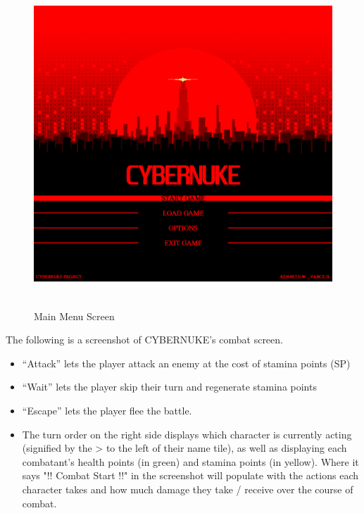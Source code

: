 \documentclass[10pt,conference,onecolumn,compsoc]{IEEEtran}
\begin{document}
\begin{figure}[ht!]
\centering
\includegraphics[height=462px, width=500px]{Mockups/CYBERNUKE_MAIN_MENU_2.png}
\caption{Main Menu Screen}
\label{main_menu_mockup}
\end{figure}

\pagebreak
The following is a screenshot of CYBERNUKE's combat screen.

\begin{itemize}
\item “Attack” lets the player attack an enemy at the cost of stamina points (SP) 
\item “Wait” lets the player skip their turn and regenerate stamina points
\item “Escape” lets the player flee the battle. 
\item The turn order on the right side displays which character is currently acting (signified by the > to the left of their name tile), as well as displaying each combatant's health points (in green) and stamina points (in yellow). Where it says "!! Combat Start !!" in the screenshot will populate with the actions each character takes and how much damage they take / receive over the course of combat.
\end{itemize}
\end{document}
